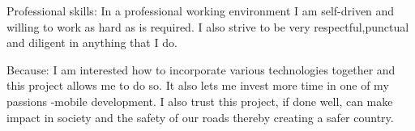 \inlineheadsection
  {Professional skills:}
  {In a professional working environment I am self-driven and willing to work as hard as is required. I also strive to be very respectful,punctual and diligent in anything that I do.}
  
\spacedhrule{1.6em}{-0.4em}  
  

\inlineheadsection
  {Because:}
  {I am interested how to incorporate various technologies together and this project allows me to do so. It also lets me invest more time in one of my passions -mobile development. I also trust this project, if done well, can make impact in society and the safety of our roads thereby creating a safer country.}